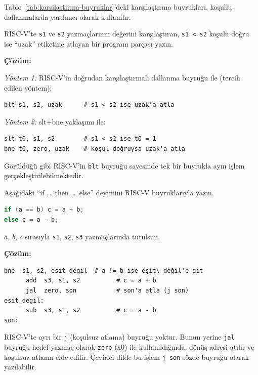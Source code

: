 Tablo~\ref{tab:karsilastirma-buyruklar}'deki karşılaştırma buyrukları, koşullu dallanmalarda yardımcı olarak kullanılır.

\begin{ornek}[3.14]
RISC-V'te \texttt{s1} ve \texttt{s2} yazmaçlarının değerini karşılaştıran, \texttt{s1 < s2} koşulu doğru ise ``uzak'' etiketine atlayan bir program parçası yazın.

\textbf{Çözüm:}

\textit{Yöntem 1:} RISC-V'in doğrudan karşılaştırmalı dallanma buyruğu ile (tercih edilen yöntem):
\begin{lstlisting}[style=riscv]
blt s1, s2, uzak      # s1 < s2 ise uzak'a atla
\end{lstlisting}

\textit{Yöntem 2:} slt+bne yaklaşımı ile:
\begin{lstlisting}[style=riscv]
slt t0, s1, s2        # s1 < s2 ise t0 = 1
bne t0, zero, uzak    # koşul doğruysa uzak'a atla
\end{lstlisting}

Görüldüğü gibi RISC-V'in \texttt{blt} buyruğu sayesinde tek bir buyrukla aynı işlem gerçekleştirilebilmektedir.
\end{ornek}

\begin{ornek}[3.15]
Aşağıdaki ``if \ldots\ then \ldots\ else'' deyimini RISC-V buyruklarıyla yazın.
\begin{lstlisting}[language=C]
if (a == b) c = a + b;
else c = a - b;
\end{lstlisting}
$a$, $b$, $c$ sırasıyla \texttt{s1}, \texttt{s2}, \texttt{s3} yazmaçlarında tutulsun.

\textbf{Çözüm:}
\begin{lstlisting}[style=riscv]
      bne  s1, s2, esit_degil  # a != b ise eşit\_değil'e git
      add  s3, s1, s2          # c = a + b
      jal  zero, son           # son'a atla (j son)
esit_degil:
      sub  s3, s1, s2          # c = a - b
son:
\end{lstlisting}

RISC-V'te ayrı bir \texttt{j} (koşulsuz atlama) buyruğu yoktur. Bunun yerine \texttt{jal} buyruğu hedef yazmaç olarak \texttt{zero} (x0) ile kullanıldığında, dönüş adresi atılır ve koşulsuz atlama elde edilir. Çevirici dilde bu işlem \texttt{j son} sözde buyruğu olarak yazılabilir.
\end{ornek}

